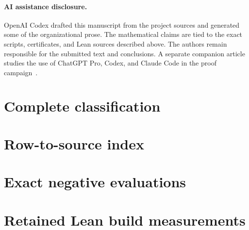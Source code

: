 \documentclass[11pt]{article}
\numberwithin{equation}{section}
\theoremstyle{definition}
\theoremstyle{remark}
\begin{document}
\paragraph{AI assistance disclosure.}
OpenAI Codex drafted this manuscript from the project sources and generated
some of the organizational prose.  The mathematical claims are tied to the
exact scripts, certificates, and Lean sources described above.  The authors
remain responsible for the submitted text and conclusions.  A separate
companion article studies the use of ChatGPT Pro, Codex, and Claude Code in
the proof campaign~\cite{CompanionAI2026}.

\appendix

\section{Complete classification}
\label{app:classification}


\section{Row-to-source index}
\label{app:row-sources}


\section{Exact negative evaluations}
\label{app:negative}


\section{Retained Lean build measurements}
\label{app:verification}




\end{document}

